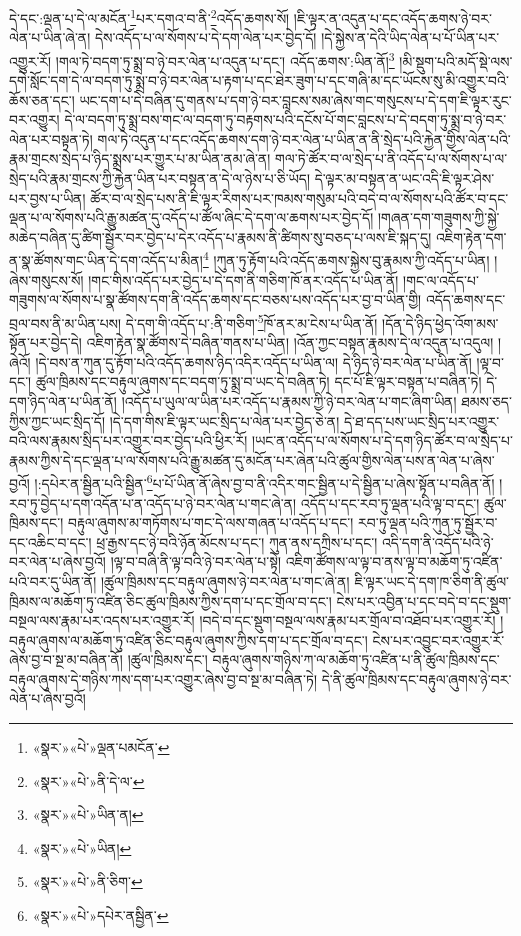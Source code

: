 དེ་དང་:ལྡན་པ་དེ་ལ་མངོན་\footnote{«སྣར་»«པེ་»ལྡན་པམངོན་}པར་དགའ་བ་ནི་\footnote{«སྣར་»«པེ་»ནི་དེ་ལ་}འདོད་ཆགས་སོ། །ཇི་ལྟར་ན་འདུན་པ་དང་འདོད་ཆགས་ཉེ་བར་ལེན་པ་ཡིན་ཞེ་ན། དེས་འདོད་པ་ལ་སོགས་པ་དེ་དག་ལེན་པར་བྱེད་དོ། །དེ་སྐྱེས་ན་དེའི་ཡིད་ལེན་པ་པོ་ཡིན་པར་འགྱུར་རོ། །གལ་ཏེ་བདག་ཏུ་སྨྲ་བ་ཉེ་བར་ལེན་པ་འདུན་པ་དང་། འདོད་ཆགས་:ཡིན་ནོ།\footnote{«སྣར་»«པེ་»ཡིན་ན།} །མི་སྡུག་པའི་མདོ་སྡེ་ལས་དགེ་སློང་དག་དེ་ལ་བདག་ཏུ་སྨྲ་བ་ཉེ་བར་ལེན་པ་རྟག་པ་དང་ཐེར་ཟུག་པ་དང་གཞི་མ་དང་ཡོངས་སུ་མི་འགྱུར་བའི་ཆོས་ཅན་དང་། ཡང་དག་པ་དེ་བཞིན་དུ་གནས་པ་དག་ཉེ་བར་བླངས་སམ་ཞེས་གང་གསུངས་པ་དེ་དག་ཇི་ལྟར་རུང་བར་འགྱུར། དེ་ལ་བདག་ཏུ་སྨྲ་བས་གང་ལ་བདག་ཏུ་བརྟགས་པའི་དངོས་པོ་གང་བླངས་པ་དེ་བདག་ཏུ་སྨྲ་བ་ཉེ་བར་ལེན་པར་བསྟན་ཏེ། གལ་ཏེ་འདུན་པ་དང་འདོད་ཆགས་དག་ཉེ་བར་ལེན་པ་ཡིན་ན་ནི་སྲེད་པའི་རྐྱེན་གྱིས་ལེན་པའི་རྣམ་གྲངས་སྲེད་པ་ཉིད་སྨྲས་པར་གྱུར་པ་མ་ཡིན་ནམ་ཞེ་ན། གལ་ཏེ་ཚོར་བ་ལ་སྲེད་པ་ནི་འདོད་པ་ལ་སོགས་པ་ལ་སྲེད་པའི་རྣམ་གྲངས་ཀྱི་རྐྱེན་ཡིན་པར་བསྟན་ན་དེ་ལ་ཉེས་པ་ཅི་ཡོད། དེ་ལྟར་མ་བསྟན་ན་ཡང་འདི་ཇི་ལྟར་ཤེས་པར་བྱས་པ་ཡིན། ཚོར་བ་ལ་སྲེད་པས་ནི་ཇི་ལྟར་རིགས་པར་ཁམས་གསུམ་པའི་བདེ་བ་ལ་སོགས་པའི་ཚོར་བ་དང་ལྡན་པ་ལ་སོགས་པའི་རྒྱུ་མཚན་དུ་འདོད་པ་ཚོལ་ཞིང་དེ་དག་ལ་ཆགས་པར་བྱེད་དོ། །གཞན་དག་གཟུགས་ཀྱི་སྐྱེ་མཆེད་བཞིན་དུ་ཚིག་སྦྱོར་བར་བྱེད་པ་དེར་འདོད་པ་རྣམས་ནི་ཚིགས་སུ་བཅད་པ་ལས་ཇི་སྐད་དུ། འཇིག་རྟེན་དག་ན་སྣ་ཚོགས་གང་ཡིན་དེ་དག་འདོད་པ་མིན།\footnote{«སྣར་»«པེ་»ཡིན།} །ཀུན་ཏུ་རྟོག་པའི་འདོད་ཆགས་སྐྱེས་བུ་རྣམས་ཀྱི་འདོད་པ་ཡིན། །ཞེས་གསུངས་སོ། །གང་གིས་འདོད་པར་བྱེད་པ་དེ་དག་ནི་གཅིག་ཁོ་ནར་འདོད་པ་ཡིན་ནོ། །གང་ལ་འདོད་པ་གཟུགས་ལ་སོགས་པ་སྣ་ཚོགས་དག་ནི་འདོད་ཆགས་དང་བཅས་པས་འདོད་པར་བྱ་བ་ཡིན་གྱི། འདོད་ཆགས་དང་བྲལ་བས་ནི་མ་ཡིན་པས། དེ་དག་གི་འདོད་པ་:ནི་གཅིག་\footnote{«སྣར་»«པེ་»ནི་ཅིག་}ཁོ་ནར་མ་ངེས་པ་ཡིན་ནོ། །དོན་དེ་ཉིད་ཕྱེད་འོག་མས་སྟོན་པར་བྱེད་དེ། འཇིག་རྟེན་སྣ་ཚོགས་དེ་བཞིན་གནས་པ་ཡིན། །འོན་ཀྱང་བསྟན་རྣམས་དེ་ལ་འདུན་པ་འདུལ། །ཞེའོ། །དེ་བས་ན་ཀུན་དུ་རྟོག་པའི་འདོད་ཆགས་ཉིད་འདིར་འདོད་པ་ཡིན་ལ། དེ་ཉིད་ཉེ་བར་ལེན་པ་ཡིན་ནོ། །ལྟ་བ་དང་། ཚུལ་ཁྲིམས་དང་བརྟུལ་ཞུགས་དང་བདག་ཏུ་སྨྲ་བ་ཡང་དེ་བཞིན་ཏེ། དང་པོ་ཇི་ལྟར་བསྟན་པ་བཞིན་ཏེ། དེ་དག་ཉིད་ལེན་པ་ཡིན་ནོ། །འདོད་པ་ཡུལ་ལ་ཡིན་པར་འདོད་པ་རྣམས་ཀྱི་ཉེ་བར་ལེན་པ་གང་ཞིག་ཡིན། ཐམས་ཅད་ཀྱིས་ཀྱང་ཡང་སྲིད་དོ། །དེ་དག་གིས་ཇི་ལྟར་ཡང་སྲིད་པ་ལེན་པར་བྱེད་ཅེ་ན། དེ་ཐ་དད་པས་ཡང་སྲིད་པར་འགྱུར་བའི་ལས་རྣམས་སྲིད་པར་འགྱུར་བར་བྱེད་པའི་ཕྱིར་རོ། །ཡང་ན་འདོད་པ་ལ་སོགས་པ་དེ་དག་ཉིད་ཚོར་བ་ལ་སྲེད་པ་རྣམས་ཀྱིས་དེ་དང་ལྡན་པ་ལ་སོགས་པའི་རྒྱུ་མཚན་དུ་མངོན་པར་ཞེན་པའི་ཚུལ་གྱིས་ལེན་པས་ན་ལེན་པ་ཞེས་བྱའོ། །:དཔེར་ན་སྦྱིན་པའི་སྦྱིན་\footnote{«སྣར་»«པེ་»དཔེར་ནསྦྱིན་}པ་པོ་ཡིན་ནོ་ཞེས་བྱ་བ་ནི་འདིར་གང་སྦྱིན་པ་དེ་སྦྱིན་པ་ཞེས་སྟོན་པ་བཞིན་ནོ། །རབ་ཏུ་བྱེད་པ་དག་འདོན་པ་ན་འདོད་པ་ཉེ་བར་ལེན་པ་གང་ཞེ་ན། འདོད་པ་དང་རབ་ཏུ་ལྡན་པའི་ལྟ་བ་དང་། ཚུལ་ཁྲིམས་དང་། བརྟུལ་ཞུགས་མ་གཏོགས་པ་གང་དེ་ལས་གཞན་པ་འདོད་པ་དང་། རབ་ཏུ་ལྡན་པའི་ཀུན་ཏུ་སྦྱོར་བ་དང་འཆིང་བ་དང་། ཕྲ་རྒྱས་དང་ཉེ་བའི་ཉོན་མོངས་པ་དང་། ཀུན་ནས་དཀྲིས་པ་དང་། འདི་དག་ནི་འདོད་པའི་ཉེ་བར་ལེན་པ་ཞེས་བྱའོ། །ལྟ་བ་བཞི་ནི་ལྟ་བའི་ཉེ་བར་ལེན་པ་སྟེ། འཇིག་ཚོགས་ལ་ལྟ་བ་ནས་ལྟ་བ་མཆོག་ཏུ་འཛིན་པའི་བར་དུ་ཡིན་ནོ། །ཚུལ་ཁྲིམས་དང་བརྟུལ་ཞུགས་ཉེ་བར་ལེན་པ་གང་ཞེ་ན། ཇི་ལྟར་ཡང་དེ་དག་ཁ་ཅིག་ནི་ཚུལ་ཁྲིམས་ལ་མཆོག་ཏུ་འཛིན་ཅིང་ཚུལ་ཁྲིམས་ཀྱིས་དག་པ་དང་གྲོལ་བ་དང་། ངེས་པར་འབྱིན་པ་དང་བདེ་བ་དང་སྡུག་བསྔལ་ལས་རྣམ་པར་འདས་པར་འགྱུར་རོ། །བདེ་བ་དང་སྡུག་བསྔལ་ལས་རྣམ་པར་གྲོལ་བ་འཐོབ་པར་འགྱུར་རོ། །བརྟུལ་ཞུགས་ལ་མཆོག་ཏུ་འཛིན་ཅིང་བརྟུལ་ཞུགས་ཀྱིས་དག་པ་དང་གྲོལ་བ་དང་། ངེས་པར་འབྱུང་བར་འགྱུར་རོ་ཞེས་བྱ་བ་སྔ་མ་བཞིན་ནོ། །ཚུལ་ཁྲིམས་དང་། བརྟུལ་ཞུགས་གཉིས་ཀ་ལ་མཆོག་ཏུ་འཛིན་པ་ནི་ཚུལ་ཁྲིམས་དང་བརྟུལ་ཞུགས་དེ་གཉིས་ཀས་དག་པར་འགྱུར་ཞེས་བྱ་བ་སྔ་མ་བཞིན་ཏེ། དེ་ནི་ཚུལ་ཁྲིམས་དང་བརྟུལ་ཞུགས་ཉེ་བར་ལེན་པ་ཞེས་བྱའོ། 